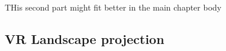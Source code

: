 
THis second part might fit better in the main chapter body

\subsection{VR Landscape projection}


